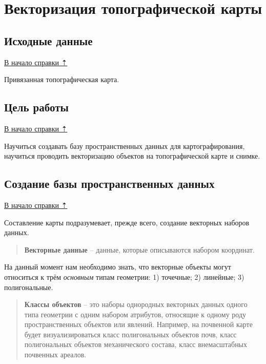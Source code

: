 \documentclass[
  russian,
  letterpaper,
  DIV=11,
  numbers=noendperiod]{scrreprt}
\begin{document}

\chapter{Векторизация топографической
карты}\label{ux432ux435ux43aux442ux43eux440ux438ux437ux430ux446ux438ux44f-ux442ux43eux43fux43eux433ux440ux430ux444ux438ux447ux435ux441ux43aux43eux439-ux43aux430ux440ux442ux44b}

\label{digitize}{}

\section{Исходные данные}\label{digitize-initial}

\hyperref[digitize]{В начало справки ⇡}

Привязанная топографическая карта.

\section{Цель работы}\label{digitize-task}

\hyperref[digitize]{В начало справки ⇡}

Научиться создавать базу пространственных данных для картографирования,
научиться проводить векторизацию объектов на топографической карте и
снимке.

\section{Создание базы пространственных данных}\label{digitize-database}

\hyperref[digitize]{В начало справки ⇡}

Составление карты подразумевает, прежде всего, создание векторных
наборов данных.

\begin{quote}
\textbf{Векторные данные} -- данные, которые описываются набором
координат.
\end{quote}

На данный момент нам необходимо знать, что векторные объекты могут
относиться к трём \emph{основным} типам геометрии: 1) точечные; 2)
линейные; 3) полигональные.

\begin{quote}
\textbf{Классы объектов} -- это наборы однородных векторных данных
одного типа геометрии с одним набором атрибутов, относящие к одному роду
пространственных объектов или явлений. Например, на почвенной карте
будет визуализироваться класс полигональных объектов почв, класс
полигональных объектов механического состава, класс внемасштабных
почвенных ареалов.
\end{quote}
\end{document}
